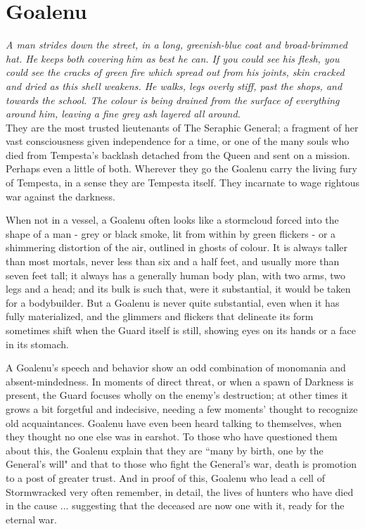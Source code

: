 \section*{Goalenu}

\textit{A man strides down the street, in a long, greenish-blue coat and broad-brimmed hat. He keeps both covering him as best he can. If you could see his flesh, you could see the cracks of green fire which spread out from his joints, skin cracked and dried as this shell weakens. He walks, legs overly stiff, past the shops, and towards the school. The colour is being drained from the surface of everything around him, leaving a fine grey ash layered all around.}\\

\noindent They are the most trusted lieutenants of The Seraphic General; a fragment of her vast consciousness given independence for a time, or one of the many souls who died from Tempesta's backlash detached from the Queen and sent on a mission. Perhaps even a little of both. Wherever they go the Goalenu carry the living fury of Tempesta, in a sense they are Tempesta itself. They incarnate to wage rightous war against the darkness.

When not in a vessel, a Goalenu often looks like a stormcloud forced into the shape of a man - grey or black smoke, lit from within by green flickers - or a shimmering distortion of the air, outlined in ghosts of colour. It is always taller than most mortals, never less than six and a half feet, and usually more than seven feet tall; it always has a generally human body plan, with two arms, two legs and a head; and its bulk is such that, were it substantial, it would be taken for a bodybuilder. But a Goalenu is never quite substantial, even when it has fully materialized, and the glimmers and flickers that delineate its form sometimes shift when the Guard itself is still, showing eyes on its hands or a face in its stomach.

A Goalenu's speech and behavior show an odd combination of monomania and absent-mindedness. In moments of direct threat, or when a spawn of Darkness is present, the Guard focuses wholly on the enemy's destruction; at other times it grows a bit forgetful and indecisive, needing a few moments' thought to recognize old acquaintances. Goalenu have even been heard talking to themselves, when they thought no one else was in earshot. To those who have questioned them about this, the Goalenu explain that they are \textquotedblleft many by birth, one by the General's will" and that to those who fight the General's war, death is promotion to a post of greater trust. And in proof of this, Goalenu who lead a cell of Stormwracked very often remember, in detail, the lives of hunters who have died in the cause ... suggesting that the deceased are now one with it, ready for the eternal war. 

